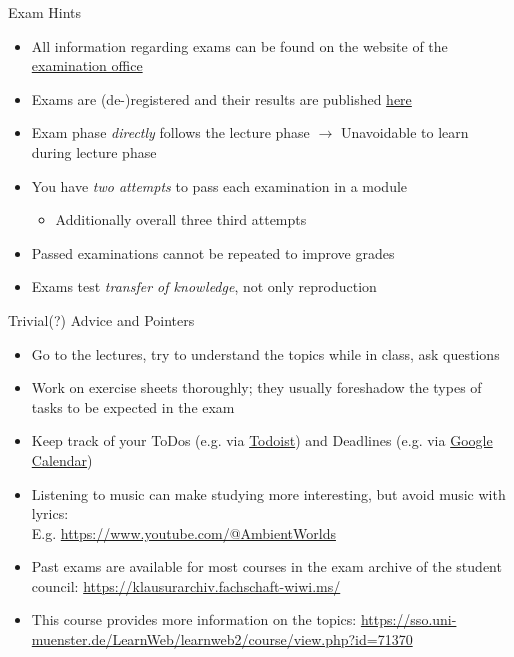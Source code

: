 \documentclass{ercisbeamer}
\begin{document}
\begin{frame}{Exam Hints}
    \begin{itemize}
        \item All information regarding exams can be found on the website of the \href{https://www.wiwi.uni-muenster.de/pam/en/examinations/schedule-examination-offer-examination-rooms}{examination office}
        \item Exams are (de-)registered and their results are published \href{https://pam-portal.uni-muenster.de/}{here}
        \item Exam phase \emph{directly} follows the lecture phase $\rightarrow$ Unavoidable to learn during lecture phase
        \item You have \emph{two attempts} to pass each examination in a module
        \begin{itemize}
            \item Additionally overall three third attempts
        \end{itemize}
        \item Passed examinations cannot be repeated to improve grades
        \item Exams test \emph{transfer of knowledge}, not only reproduction
    \end{itemize}
\end{frame}

\begin{frame}{Trivial(?) Advice and Pointers}
    \begin{itemize}
        \item Go to the lectures, try to understand the topics while in class, ask questions
        \item Work on exercise sheets thoroughly; they usually foreshadow the types of tasks to be expected in the exam
        \item Keep track of your ToDos (e.g. via \href{https://todoist.com/}{Todoist}) and Deadlines (e.g. via \href{https://workspace.google.com/products/calendar/}{Google Calendar})
        \item Listening to music can make studying more interesting, but avoid music with lyrics: \\ E.g. \url{https://www.youtube.com/@AmbientWorlds}
        \item Past exams are available for most courses in the exam archive of the student council: \url{https://klausurarchiv.fachschaft-wiwi.ms/}
        \item This course  provides more information on the topics: \url{https://sso.uni-muenster.de/LearnWeb/learnweb2/course/view.php?id=71370}
    \end{itemize}
\end{frame}
\end{document}
